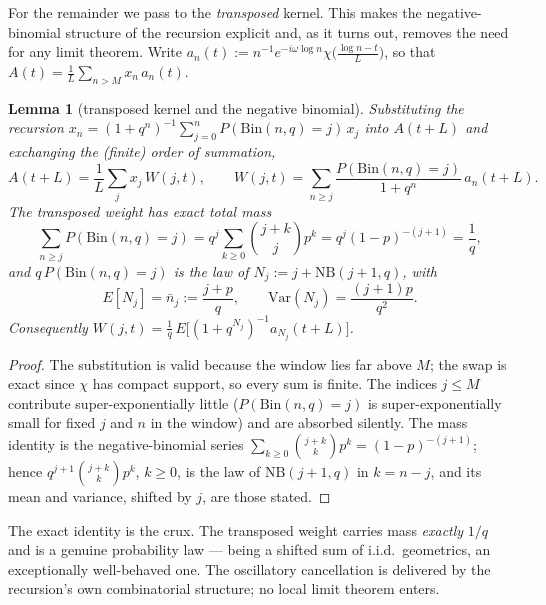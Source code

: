 \documentclass[11pt]{article}
\newtheorem{lemma}[theorem]{Lemma}
\theoremstyle{definition}
\begin{document}
For the remainder we pass to the \emph{transposed} kernel. This makes
the negative-binomial structure of the recursion explicit and, as it
turns out, removes the need for any limit theorem. Write
$a_n(t):=n^{-1}e^{-i\omega\log n}\chi\bigl(\tfrac{\log n-t}L\bigr)$, so
that $A(t)=\frac1L\sum_{n>M}x_n\,a_n(t)$.

\begin{lemma}[transposed kernel and the negative binomial]%
\label{lem:transposed}
  Substituting the recursion
  $x_n=(1+q^n)^{-1}\sum_{j=0}^{n}P(\mathrm{Bin}(n,q)=j)\,x_j$
  into $A(t+L)$ and exchanging the (finite) order of summation,
  \[
    A(t+L)=\frac1L\sum_{j}x_j\,W(j,t),\qquad
    W(j,t)=\sum_{n\ge j}\frac{P(\mathrm{Bin}(n,q)=j)}{1+q^n}\,
           a_n(t+L).
  \]
  The transposed weight has \emph{exact} total mass
  \[
    \sum_{n\ge j}P(\mathrm{Bin}(n,q)=j)
      =q^{j}\sum_{k\ge0}\binom{j+k}{j}p^{k}
      =q^{j}(1-p)^{-(j+1)}=\frac1q ,
  \]
  and $q\,P(\mathrm{Bin}(n,q)=j)$ is the law of
  $N_j:=j+\mathrm{NB}(j+1,q)$, with
  \[
    E[N_j]=\bar n_j:=\frac{j+p}{q},\qquad
    \mathrm{Var}(N_j)=\frac{(j+1)p}{q^{2}} .
  \]
  Consequently
  $W(j,t)=\tfrac1q\,E\bigl[(1+q^{N_j})^{-1}a_{N_j}(t+L)\bigr]$.
\end{lemma}

\begin{proof}
  The substitution is valid because the window lies far above $M$;
  the swap is exact since $\chi$ has compact support, so every sum is
  finite. The indices $j\le M$ contribute super-exponentially little
  ($P(\mathrm{Bin}(n,q)=j)$ is super-exponentially small for fixed $j$
  and $n$ in the window) and are absorbed silently. The mass identity
  is the negative-binomial series
  $\sum_{k\ge0}\binom{j+k}{k}p^{k}=(1-p)^{-(j+1)}$; hence
  $q^{j+1}\binom{j+k}{k}p^{k}$, $k\ge0$, is the law of
  $\mathrm{NB}(j+1,q)$ in $k=n-j$, and its mean and variance, shifted
  by $j$, are those stated.
\end{proof}

The exact identity is the crux. The transposed weight carries mass
\emph{exactly} $1/q$ and is a genuine probability law --- being a
shifted sum of i.i.d.\ geometrics, an exceptionally well-behaved one.
The oscillatory cancellation is delivered by the recursion's own
combinatorial structure; no local limit theorem enters.
\end{document}
